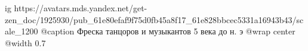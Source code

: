  
 
 
 
 

\ifcmt
  ig https://avatars.mds.yandex.net/get-zen_doc/1925930/pub_61e80efaf9f75d0fb45a8f17_61e828bbcec5331a16943b43/scale_1200
  @caption Фреска танцоров и музыкантов 5 века до н. э
  @wrap center
  @width 0.7
\fi
